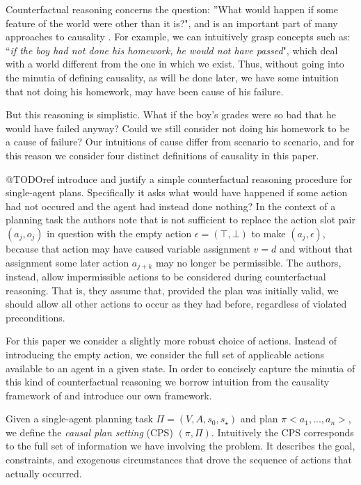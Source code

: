 \documentclass{article}
\theoremstyle{plain}
\theoremstyle{definition}
\begin{document}
Counterfactual reasoning concerns the question: ''What would happen if some feature of the world were other than it is?", and is an important part of many approaches to causality \cite{halpern2005causes}. For example, we can intuitively grasp concepts such as: ``\textit{if the boy had not done his homework, he would not have passed}", which deal with a world different from the one in which we exist. Thus, without going into the minutia of defining causality, as will be done later, we have some intuition that not doing his homework, may have been cause of his failure.

But this reasoning is simplistic. What if the boy's grades were so bad that he would have failed anyway? Could we still consider not doing his homework to be a cause of failure? Our intuitions of cause differ from scenario to scenario, and for this reason we consider four distinct definitions of causality in this paper.

@TODOref introduce and justify a simple counterfactual reasoning procedure for single-agent plans. Specifically it asks what would have happened if some action had not occured and the agent had instead done nothing? In the context of a planning task the authors note that is not sufficient to replace the action slot pair $(a_j, o_j)$ in question with the empty action $\epsilon=(\top, \bot)$ to make $(a_j, \epsilon)$, because that action may have caused variable assignment $v=d$ and without that assignment some later action $a_{j+k}$ may no longer be permissible. The authors, instead, allow impermissible actions to be considered during counterfactual reasoning. That is, they assume that, provided the plan was initially valid, we should allow all other actions to occur as they had before, regardless of violated preconditions.

For this paper we consider a slightly more robust choice of actions. Instead of introducing the empty action, we consider the full set of applicable actions available to an agent in a given state. In order to concisely capture the minutia of this kind of counterfactual reasoning we borrow intuition from the causality framework of \cite{halpern2005causes} and introduce our own framework.

Given a single-agent planning task $\Pi=(V, A, s_0, s_\star)$ and plan $\pi<a_1,...,a_n>$, we define the \textit{causal plan setting} (CPS) $(\pi,\Pi)$. Intuitively the CPS corresponds to the full set of information we have involving the problem. It describes the goal, constraints, and exogenous circumstances that drove the sequence of actions that actually occurred.
\end{document}
